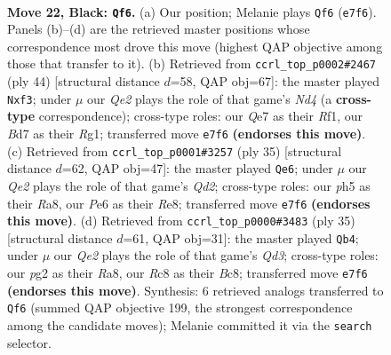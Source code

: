 \documentclass[11pt]{article}
\begin{document}
\clearpage

\begin{figure}[p]\centering
\begin{subfigure}{0.46\textwidth}\centering
\resizebox{\linewidth}{!}{%
\newchessgame
\chessboard[
  setfen={1rr3k1/1p1bqppp/2n1p3/2Pp3P/p2P4/P1P2N2/R2QBPP1/2R3K1 b - - 2 22},
  showmover=false,
  pgfstyle=straightmove, color=movearrow, markmove={e7-f6}
]}
\caption{}
\end{subfigure}\hfill
\begin{subfigure}{0.46\textwidth}\centering
\resizebox{\linewidth}{!}{%
\newchessgame
\chessboard[
  setfen={r2qr1k1/4bpp1/p2p4/3Pn1Pp/1p1N3P/4Bp2/PPPQ4/1K3RR1 w - - 0 23},
  showmover=false,
  pgfstyle=straightmove, color=movearrow, markmove={d4-f3}
]}
\caption{}
\end{subfigure}
\\[4pt]
\begin{subfigure}{0.46\textwidth}\centering
\resizebox{\linewidth}{!}{%
\newchessgame
\chessboard[
  setfen={r3r1k1/1p1qbpp1/p2p1n1p/4p3/PPP5/3PBN1P/4QPP1/R2R2K1 b - - 0 18},
  showmover=false,
  pgfstyle=straightmove, color=movearrow, markmove={d7-e6}
]}
\caption{}
\end{subfigure}\hfill
\begin{subfigure}{0.46\textwidth}\centering
\resizebox{\linewidth}{!}{%
\newchessgame
\chessboard[
  setfen={r1b2rk1/1p1n2pp/3qpp2/p2p4/P2P1PP1/3BP3/1P1NQR1P/R5K1 b - - 1 18},
  showmover=false,
  pgfstyle=straightmove, color=movearrow, markmove={d6-b4}
]}
\caption{}
\end{subfigure}
\caption{\textbf{Move 22, Black: \texttt{Qf6}.} (a) Our position; Melanie plays \texttt{Qf6} (\texttt{e7f6}). Panels (b)--(d) are the retrieved master positions whose correspondence most drove this move (highest QAP objective among those that transfer to it). (b) Retrieved from \texttt{ccrl\_top\_p0002\#2467} (ply 44) [structural distance $d$=58, QAP obj=67]: the master played \texttt{Nxf3}; under $\mu$ our \emph{Qe2} plays the role of that game's \emph{Nd4} (a \textbf{cross-type} correspondence); cross-type roles: our \emph{Q}e7 as their \emph{R}f1, our \emph{B}d7 as their \emph{R}g1; transferred move \texttt{e7f6} \textbf{(endorses this move)}. (c) Retrieved from \texttt{ccrl\_top\_p0001\#3257} (ply 35) [structural distance $d$=62, QAP obj=47]: the master played \texttt{Qe6}; under $\mu$ our \emph{Qe2} plays the role of that game's \emph{Qd2}; cross-type roles: our \emph{p}h5 as their \emph{R}a8, our \emph{P}e6 as their \emph{R}e8; transferred move \texttt{e7f6} \textbf{(endorses this move)}. (d) Retrieved from \texttt{ccrl\_top\_p0000\#3483} (ply 35) [structural distance $d$=61, QAP obj=31]: the master played \texttt{Qb4}; under $\mu$ our \emph{Qe2} plays the role of that game's \emph{Qd3}; cross-type roles: our \emph{p}g2 as their \emph{R}a8, our \emph{R}c8 as their \emph{B}c8; transferred move \texttt{e7f6} \textbf{(endorses this move)}. Synthesis: 6 retrieved analogs transferred to \texttt{Qf6} (summed QAP objective 199, the strongest correspondence among the candidate moves); Melanie committed it via the \texttt{search} selector.}
\label{fig:thought-m43}
\end{figure}
\end{document}

